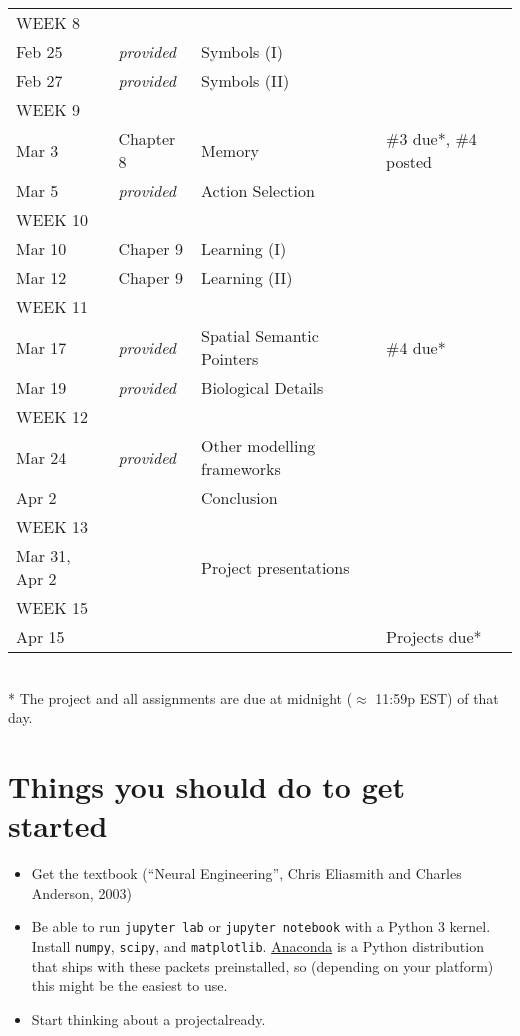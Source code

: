 \documentclass[10pt,letterpaper,oneside]{article}
\begin{document}
\begin{center}
\begin{tabular}{p{2.5cm} p{2.5cm} p{6cm} p{3.75cm}}
	\footnotesize WEEK 8 & & & \\
	Feb 25 &
	\emph{provided} &
	Symbols (I) &
	\\
	Feb 27 &
	\emph{provided} &
	Symbols (II) &
	\\[0.125cm]

	\footnotesize WEEK 9 & & & \\
	Mar 3 &
	Chapter 8 &
	Memory &
	\#3 due*, \#4 posted\\
	Mar 5 &
	\emph{provided} &
	Action Selection &
	\\[0.125cm]

	\footnotesize WEEK 10 & & & \\
	Mar 10 &
	Chaper 9 &
	Learning (I) &
	\\
	Mar 12 &
	Chaper 9 &
	Learning (II) &
	\\[0.125cm]

	\footnotesize WEEK 11 & & & \\
	Mar 17 &
	\emph{provided} &
	Spatial Semantic Pointers &
	\#4 due*\\
	Mar 19 &
	\emph{provided} &
	Biological Details &
	\\[0.125cm]

	\footnotesize WEEK 12 & & & \\
	Mar 24 &
	\emph{provided} &
	Other modelling frameworks &
	\\
	Apr 2 &
	&
	Conclusion &
	\\[0.125cm]

	\footnotesize WEEK 13 & & & \\
	Mar 31, Apr 2 &
	&
	Project presentations &
	\\[0.125cm]

	\footnotesize WEEK 15 & & & \\
	Apr 15 &
	&
	&
	Projects due* \\
	\bottomrule
\end{tabular}\\[0.2cm]
\footnotesize
* The project and all assignments are due at midnight ($\approx$ 11:59p EST) of that day.
\end{center}

\newpage

\section{Things you should do to get started}

\begin{itemize}
	\item Get the textbook (\enquote{Neural Engineering}, Chris Eliasmith and Charles Anderson, 2003)
	\item Be able to run \texttt{jupyter lab} or \texttt{jupyter notebook} with a Python 3 kernel. Install \texttt{numpy}, \texttt{scipy}, and \texttt{matplotlib}. \href{https://www.anaconda.com/distribution/}{Anaconda} is a Python distribution that ships with these packets preinstalled, so (depending on your platform) this might be the easiest to use.
	\item Start thinking about a project\textellipsis already.
\end{itemize}

\printbibliography
\end{document}
